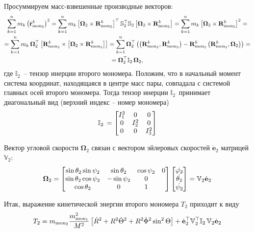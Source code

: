 \documentclass[14pt]{extarticle}
\newcommand{\mmf}{m_{\textup{mon}_1}}
\newcommand{\mms}{m_{\textup{mon}_2}}
\newcommand{\vRms}{\mathbf{R}_{\textup{mon}_2}}
\newcommand{\dvrms}{\dot{\mathbf{r}}_{\textup{mon}_2}}
\newcommand{\dveulers}{\dot{\mathbf{e}}_2}
\newcommand{\dR}{\dot{R}}
\newcommand{\dTheta}{\dot{\Theta}}
\newcommand{\dPhi}{\dot{\Phi}}
\newcommand{\Omt}{\boldsymbol{\Omega}_2}
\newcommand{\bbVs}{\mathbb{V}_2}
\newcommand{\bbSs}{\mathbb{S}_2}
\newcommand{\bbIt}{\mathbb{I}_2 \,}
\newcommand{\If}{I_1^2}
\newcommand{\Is}{I_2^2}
\newcommand{\It}{I_3^2}
\newcommand{\lb}{\left(}
\newcommand{\rb}{\right)}
\newcommand{\lsq}{\left[}
\newcommand{\rsq}{\right]}
\begin{document}
Просуммируем масс-взвешенные производные векторов:
\begin{gather}
	\sum_{k=1}^n m_k \lb \dvrms^k \rb^2 = \sum_{k=1}^n m_k \lsq \Omt \times \vRms^k \right]^\top \bbSs^\top \bbSs \lsq \Omt \times \vRms^k \rsq = \sum_{k=1}^n m_k \lsq \Omt \times \vRms^k \rsq^2 = \notag \\
	= \sum_{k=1}^n m_k \, \Omt^\top \lsq \vRms^k \times \lsq \Omt \times \vRms^k \rsq \rsq = \sum_{k=1}^n \Omt^\top \lb \lb \vRms^k, \vRms^k \rb - \vRms^k \lb \vRms^k, \Omt \rb \rb  = \notag \\ = \Omt^\top \bbIt \Omt, \notag
\end{gather}
где $\bbIt$ -- тензор инерции второго мономера. Положим, что в начальный момент система координат, находящаяся в центре масс пары, совпадала с системой главных осей второго мономера. Тогда тензор инерции $\bbIt$ принимает диагональный вид (верхний индекс -- номер мономера)
\begin{gather}
	\bbIt = \begin{bmatrix}
		\If & 0 & 0 \\
		0 & \Is & 0 \\
		0 & 0 & \It
	\end{bmatrix} \notag
\end{gather}

Вектор угловой скорости $\Omt$ связан с вектором эйлеровых скоростей $\dveulers$ матрицей $\bbVs$:
\begin{gather}
	\Omt = \begin{bmatrix}
		\sin \theta_2 \sin \psi_2 & \sin \theta_2 & \cos \psi_2 & 0 \\
		\sin \theta_2 \cos \psi_2 & - \sin \psi_2 & 0 \\
		\cos \theta_2 & 0 & 1
	\end{bmatrix} 
	\begin{bmatrix}
		\dot{\varphi_2} \\
		\dot{\theta_2} \\
		\dot {\psi_2} 
	\end{bmatrix} =
	\bbVs \dveulers \notag
\end{gather}

Итак, выражение кинетической энергии второго мономера $T_2$ приходит к виду
\begin{gather}
	T_2 = \mms \frac{\mmf^2}{M^2} \lsq \dR^2 + R^2 \dTheta^2 + R^2 \dPhi^2 \sin^2 \Theta \rsq + \dveulers^\top \bbVs^\top \bbIt \bbVs \dveulers
\end{gather}
\end{document}
